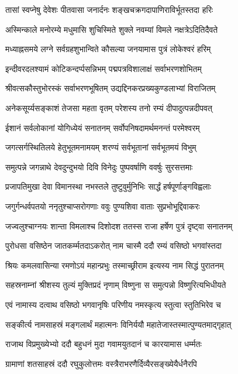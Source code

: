 \twolineshloka
{तासां स्वप्नेषु देवेशः पीतवासा जनार्दनः}
{शङ्खचक्रगदापाणिराविर्भूतस्तदा हरिः}%

\twolineshloka
{अस्मिन्काले मनोरम्ये मधुमासि शुचिस्मिते}
{शुक्ले नवम्यां विमले नक्षत्रेऽदितिदैवते}%

\twolineshloka
{मध्याह्नसमये लग्ने सर्वग्रहशुभान्विते}
{कौसल्या जनयामास पुत्रं लोकेश्वरं हरिम्}%

\twolineshloka
{इन्दीवरदलश्यामं कोटिकन्दर्प्पसन्निभम्}
{पद्मपत्रविशालाक्षं सर्वाभरणशोभितम्}%

\twolineshloka
{श्रीवत्सकौस्तुभोरस्कं सर्वाभरणभूषितम्}
{उद्यद्दिनकरप्रख्यकुण्डलाभ्यां विराजितम्}%

\twolineshloka
{अनेकसूर्य्यसङ्काशं तेजसा महता वृतम्}
{परेशस्य तनो रम्यं दीपादुत्पन्नदीपवत्}%

\twolineshloka
{ईशानं सर्वलोकानां योगिध्येयं सनातनम्}
{सर्वोपनिषदामर्थमनन्तं परमेश्वरम्}%

\twolineshloka
{जगत्सर्गस्थितिलये हेतुभूतमनामयम्}
{शरण्यं सर्वभूतानां सर्वभूतमयं विभुम्}%

\twolineshloka
{समुत्पन्ने जगन्नाथे देवदुन्दुभयो दिवि}
{विनेदुः पुष्पवर्षाणि ववर्षुः सुरसत्तमाः}%

\twolineshloka
{प्रजापतिमुखा देवा विमानस्था नभस्तले}
{तुष्टुवुर्मुनिभिः सार्द्धं हर्षपूर्णाङ्गविह्वलाः}%

\twolineshloka
{जगुर्गन्धर्वपतयो ननृतुश्चाप्सरोगणाः}
{ववुः पुण्यशिवा वाताः सुप्रभोभूद्दिवाकरः}%

\twolineshloka
{जज्वलुश्चाग्नयः शान्ता विमलाश्च दिशोदश}
{ततस्स राजा हर्षेण पुत्रं दृष्ट्वा सनातनम्}%

\twolineshloka
{पुरोधसा वसिष्ठेन जातकर्म्मतदाऽकरोत्}
{नाम चास्मै ददौ रम्यं वसिष्ठो भगवांस्तदा}%

\twolineshloka
{श्रियः कमलवासिन्या रमणोऽयं महान्प्रभुः}
{तस्माच्छ्रीराम इत्यस्य नाम सिद्धं पुरातनम्}%

\twolineshloka
{सहस्रनाम्नां श्रीशस्य तुल्यं मुक्तिप्रदं नृणाम्}
{विष्णुना स समुत्पन्नो विष्णुरित्यभिधीयते}%

\twolineshloka
{एवं नामास्य दत्वाथ वसिष्ठो भगवानृषिः}
{परिणीय नमस्कृत्य स्तुत्वा स्तुतिभिरेव च}%

\twolineshloka
{सङ्कीर्त्य नामसाहस्रं मङ्गलार्थं महात्मनः}
{विनिर्ययौ महातेजास्तस्मात्पुण्यतमाद्गृहात्}%

\twolineshloka
{राजाथ विप्रमुख्येभ्यो ददौ बहुधनं मुदा}
{गवामयुतदानं च कारयामास धर्म्मतः}%

\twolineshloka
{ग्रामाणां शतसाहस्रं ददौ रघुकुलोत्तमः}
{वस्त्रैराभरणैर्दिव्यैरसङ्ख्येयैर्धनैरपि}%

